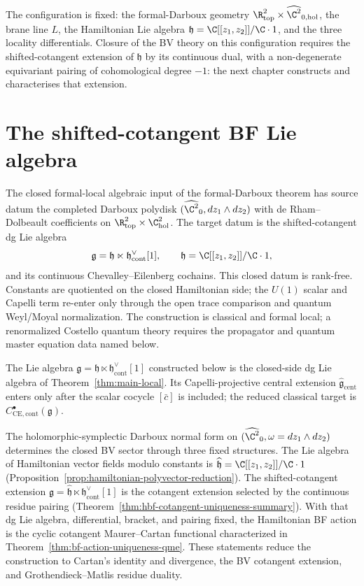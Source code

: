 \documentclass[11pt]{memoir}
\begin{document}
The configuration is fixed: the formal-Darboux geometry
\(\R^2_{\mathrm{top}}\times\widehat{\C^2}_{0,\mathrm{hol}}\), the
brane line \(L\), the Hamiltonian Lie algebra
\(\mathfrak h=\C[[z_1,z_2]]/\C\cdot 1\), and the three locality
differentials.  Closure of the BV theory on this configuration requires
the shifted-cotangent extension of \(\mathfrak h\) by its continuous
dual, with a non-degenerate equivariant pairing of cohomological
degree \(-1\): the next chapter constructs and characterises that
extension.

\section{The shifted-cotangent BF Lie algebra}\label{sec:bf-lie-algebra}\label{ssec:hamiltonian-bf-algebra}

The closed formal-local algebraic input of the formal-Darboux theorem
has source datum the completed Darboux polydisk
\((\widehat{\C^2}_0,dz_1\wedge dz_2)\) with de
Rham--Dolbeault coefficients on
\(\R^2_{\mathrm{top}}\times\C^2_{\mathrm{hol}}\).  The target datum is
the shifted-cotangent dg Lie algebra
\[
  \mathfrak g=\mathfrak h\ltimes\mathfrak h^\vee_{\mathrm{cont}}[1],
  \qquad \mathfrak h=\C[[z_1,z_2]]/\C\cdot1,
\]
and its continuous Chevalley--Eilenberg cochains.  This closed datum is
rank-free.  Constants are quotiented on the
closed Hamiltonian side; the \(U(1)\) scalar and Capelli term re-enter
only through the open trace comparison and quantum Weyl/Moyal
normalization.  The construction is classical and formal local; a
renormalized Costello quantum theory requires the propagator and quantum
master equation data named below.

The Lie algebra $\mathfrak g=\mathfrak h\ltimes\mathfrak h^\vee_{\mathrm{cont}}[1]$
constructed below is the closed-side dg Lie algebra of
Theorem~\ref{thm:main-local}.  Its Capelli-projective central extension
\(\widehat{\mathfrak g}_{\mathrm{cent}}\) enters only after the scalar
cocycle \([\bar c]\) is included; the reduced classical target is
\(C^\bullet_{\mathrm{CE},\mathrm{cont}}(\mathfrak g)\).

The holomorphic-symplectic Darboux normal form on
\((\widehat{\C^2}_0,\omega=dz_1\wedge dz_2)\) determines the closed BV
sector through three fixed structures. The Lie algebra of Hamiltonian
vector fields modulo constants is
\(\widehat{\mathfrak h}=\C[[z_1,z_2]]/\C\cdot 1\)
(Proposition~\ref{prop:hamiltonian-polyvector-reduction}). The
shifted-cotangent extension
\(\mathfrak g=\widehat{\mathfrak h}\ltimes
   \mathfrak h^\vee_{\mathrm{cont}}[1]\) is the cotangent extension
selected by the continuous residue pairing
(Theorem~\ref{thm:hbf-cotangent-uniqueness-summary}).  With that dg Lie
algebra, differential, bracket, and pairing fixed, the Hamiltonian BF
action is the cyclic cotangent Maurer--Cartan functional characterized
in Theorem~\ref{thm:bf-action-uniqueness-qme}.  These statements reduce
the construction to Cartan's identity and divergence, the BV
cotangent extension, and Grothendieck--Matlis residue duality.
\end{document}
